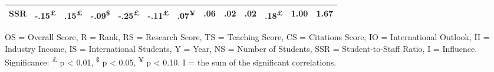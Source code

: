 \documentclass{singlecol-new}
\theoremstyle{TH}{
\newtheorem{lemma}{Lemma}
\newtheorem{theorem}[lemma]{Theorem}
\newtheorem{corrolary}[lemma]{Corrolary}
\newtheorem{conjecture}[lemma]{Conjecture}
\newtheorem{proposition}[lemma]{Proposition}
\newtheorem{claim}[lemma]{Claim}
\newtheorem{stheorem}[lemma]{Wrong Theorem}
\newtheorem{algorithm}{Algorithm}
}
\theoremstyle{THrm}{
\newtheorem{definition}{Definition}[section]
\newtheorem{question}{Question}[section]
\newtheorem{remark}{Remark}
\newtheorem{scheme}{Scheme}
}
\theoremstyle{THhit}{
\newtheorem{case}{Case}[section]
}
\begin{document}
\begin{table*}[h!]
\begin{tabular}{lrrrrrrrrrrrr}
		SSR & \cellcolor{gray!07}-.15\textsuperscript{£} & \cellcolor{gray!07}.15\textsuperscript{£} & \cellcolor{gray!05}-.09\textsuperscript{\$} & \cellcolor{gray!13}-.25\textsuperscript{£} & \cellcolor{gray!05}-.11\textsuperscript{£} & \cellcolor{gray!04}.07\textsuperscript{¥} & \cellcolor{gray!03}.06 & \cellcolor{gray!01}.02 & \cellcolor{gray!01}.02 & \cellcolor{gray!09}.18\textsuperscript{£} & \cellcolor{gray!50}1.00 & 1.67 \\
		 
		\hline
		
	\end{tabular}
	\vspace{1mm}
	
	\scriptsize
	OS = Overall Score, R = Rank, RS = Research Score, TS = Teaching Score, CS = Citations Score, IO = International Outlook, II = Industry Income, IS = International Students, Y = Year, NS = Number of Students, SSR = Student-to-Staff Ratio, I = Influence.
	Significance: \textsuperscript{£} p < 0.01, \textsuperscript{\$} p < 0.05, \textsuperscript{¥} p < 0.10. I = the sum of the significant correlations.
\end{table*}
\end{document}
